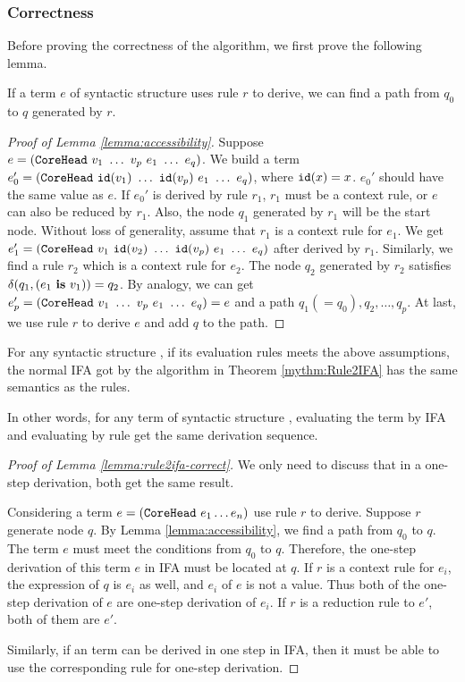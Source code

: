\subsubsection{Correctness}

Before proving the correctness of the algorithm, we first prove the following lemma.

\begin{lemma}
\label{lemma:accessibility}
If a term $e$ of syntactic structure  uses rule $r$ to derive, we can find a path from $q_0$ to $q$ generated by $r$.
\end{lemma}

\begin{proof}[Proof of Lemma \ref{lemma:accessibility}]
Suppose $e=(\mbox{\tt CoreHead}~v_1~\ldots~v_p~e_1~\ldots~e_q)$. We build a term $e_0'=(\mbox{\tt CoreHead}~\mbox{\tt id}(v_1)~\ldots~\mbox{\tt id}(v_p)~e_1~\ldots~e_q)$, where $\mbox{\tt id}(x)=x$. $e_0'$ should have the same value as $e$. If $e_0'$ is derived by rule $r_1$, $r_1$ must be a context rule, or $e$ can also be reduced by $r_1$. Also, the node $q_1$ generated by $r_1$ will be the start node. Without loss of generality, assume that $r_1$ is a context rule for $e_1$. We get $e_1'=(\mbox{\tt CoreHead}~v_1~\mbox{\tt id}(v_2)~\ldots~\mbox{\tt id}(v_p)~e_1~\ldots~e_q)$ after derived by $r_1$. Similarly, we find a rule $r_2$ which is a context rule for $e_2$. The node $q_2$ generated by $r_2$ satisfies $\delta(q_1, (e_1~\mbox{\rm \bf is}~v_1))=q_2$. By analogy, we can get $e_p'=(\mbox{\tt CoreHead}~v_1~\ldots~v_p~e_1~\ldots~e_q)=e$ and a path $q_1(=q_0), q_2, \ldots, q_p$. At last, we use rule $r$ to derive $e$ and add $q$ to the path.
\end{proof}

\begin{lemma}
\label{lemma:rule2ifa-correct}
For any syntactic structure , if its evaluation rules meets the above assumptions, the normal IFA got by the algorithm in Theorem \ref{mythm:Rule2IFA} has the same semantics as the rules. 
\end{lemma}

In other words, for any term of syntactic structure , evaluating the term by IFA and evaluating by rule get the same derivation sequence.

\begin{proof}[Proof of Lemma \ref{lemma:rule2ifa-correct}]
We only need to discuss that in a one-step derivation, both get the same result.

Considering a term $e=(\mbox{\tt CoreHead}~e_1 \ldots e_n)$ use rule $r$ to derive. Suppose $r$ generate node $q$. By Lemma \ref{lemma:accessibility}, we find a path from $q_0$ to $q$. The term $e$ must meet the conditions from $q_0$ to $q$. Therefore, the one-step derivation of this term $e$ in IFA must be located at $q$. If $r$ is a context rule for $e_i$, the expression of $q$ is $e_i$ as well, and $e_i$ of $e$ is not a value. Thus both of the one-step derivation of $e$ are one-step derivation of $e_i$. If $r$ is a reduction rule to $e'$, both of them are $e'$.

Similarly, if an term can be derived in one step in IFA, then it must be able to use the corresponding rule for one-step derivation.
\end{proof}

